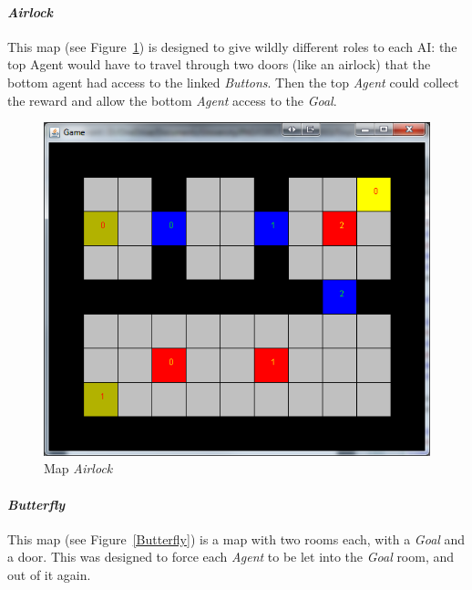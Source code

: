\documentclass{IEEEtran}
\begin{document}
\paragraph{\emph{Airlock}} This map (see Figure~\ref{Airlock}) is designed to give wildly different roles to each AI: the top Agent would have to travel through two doors (like an airlock) that the bottom agent had access to the linked \emph{Buttons}. Then the top \emph{Agent} could collect the reward and allow the bottom \emph{Agent} access to the \emph{Goal}.
\begin{figure}[!t]
\centering
\includegraphics[scale=0.35]{level5}
\caption{Map \textit{Airlock}}
\label{Airlock}
\end{figure}


\paragraph{\emph{Butterfly}} This map (see Figure~\ref{Butterfly}) is a map with two rooms each, with a \emph{Goal} and a door. This was designed to force each \emph{Agent} to be let into the \emph{Goal} room, and out of it again.
\end{document}
